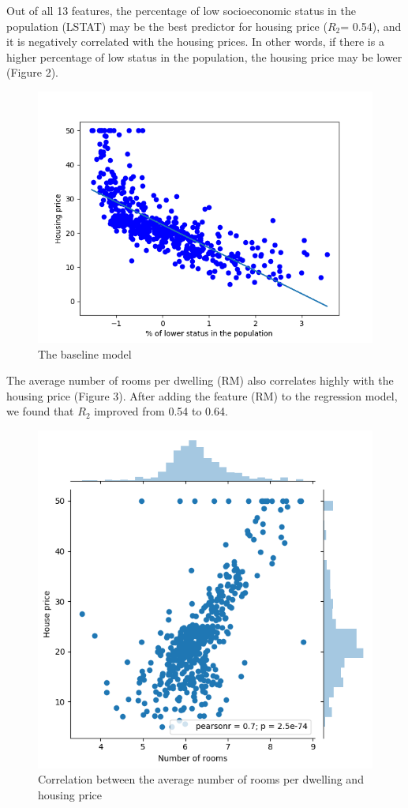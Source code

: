\documentclass[11pt]{article}
\begin{document}
 Out of all 13 features, the percentage of low socioeconomic status in the population (LSTAT) may be the best predictor for housing price ($R_{2}$= 0.54), and it is negatively correlated with the housing prices. In other words, if there is a higher percentage of low status in the population, the housing price may be lower (Figure 2). 
\begin{figure}[!htbp]
 \centering
 \includegraphics[scale = 0.5]{baseline}
 \captionsetup{font=scriptsize}
  \caption{The baseline model}
\end{figure}


The average number of rooms per dwelling (RM) also correlates highly with the housing price (Figure 3). After adding the feature (RM) to the regression model, we found that $R_{2}$ improved from 0.54 to 0.64.
\begin{figure}[!htbp]
 \centering
 \includegraphics[scale = 0.5]{RM}
 \captionsetup{font=scriptsize}
  \caption[8pt]{Correlation between the average number of rooms per dwelling and housing price}
\end{figure}
\end{document}
